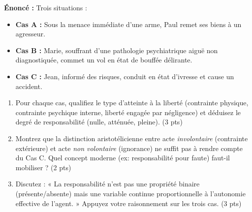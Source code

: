 \documentclass[11pt]{article}
\begin{document}
\begin{exercice}
\textbf{Énoncé :} Trois situations :
\begin{itemize}
    \item \textbf{Cas A :} Sous la menace immédiate d'une arme, Paul remet ses biens à un agresseur.
    \item \textbf{Cas B :} Marie, souffrant d'une pathologie psychiatrique aiguë non diagnostiquée, commet un vol en état de bouffée délirante.
    \item \textbf{Cas C :} Jean, informé des risques, conduit en état d'ivresse et cause un accident.
\end{itemize}
\begin{enumerate}
    \item Pour chaque cas, qualifiez le type d'atteinte à la liberté (contrainte physique, contrainte psychique interne, liberté engagée par négligence) et déduisez le degré de responsabilité (nulle, atténuée, pleine). (3 pts)
    \item Montrez que la distinction aristotélicienne entre acte \textit{involontaire} (contrainte extérieure) et acte \textit{non volontaire} (ignorance) ne suffit pas à rendre compte du Cas C. Quel concept moderne (ex: responsabilité pour faute) faut-il mobiliser ? (2 pts)
    \item Discutez : « La responsabilité n'est pas une propriété binaire (présente/absente) mais une variable continue proportionnelle à l'autonomie effective de l'agent. » Appuyez votre raisonnement sur les trois cas. (3 pts)
\end{enumerate}
\end{exercice}
\end{document}

